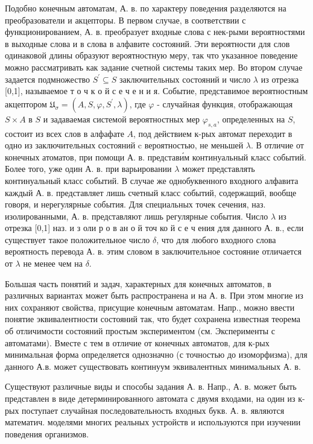 \documentclass[10pt]{article}
\begin{document}
Подобно конечным автоматам, А. в. по характеру поведения разделяются на преобразователи и акцепторы. В первом случае, в соответствии с функционированием, А. в. преобразует входные слова с нек-рыми вероятностями в выходные слова и в слова в алфавите состояний. Эти вероятности для слов одинаковой длины образуют вероятностную меру, так что указанное поведение можно рассматривать как задание счетной системы таких мер. Во втором случае задается подмножество $S^{\prime} \subseteq S$ заключительных состояний и число $\lambda$ из отрезка [0,1], называемое т о ч к о й с е ч е н и я. Событие, представимое вероятностным акцептором $\mathfrak{U}_{\sigma}=\left(A, S, \varphi, S^{\prime}, \lambda\right)$, где $\varphi$ - случайная функция, отображающая $S \times A$ в $S$ и задаваемая системой вероятностных мер $\varphi_{s, a}$, определенных на $S$, состоит из всех слов в алфафате $A$, под действием к-рых автомат переходит в одно из заключительных состояний $\mathrm{c}$ вероятностью, не меньшей $\lambda$. В отличие от конечных атоматов, при помощи А. в. представи́м континуальный класс событий. Более того, уже один А. в. при варьировании $\lambda$ может представлять континуальный класс событий. В случае же однобуквенного входного алфавита каждый А. в. представляет лишь счетный класс событий, содержащий, вообще говоря, и нерегулярные события. Для специальных точек сечения, наз. изолированными, А. в. представляют лишь регулярные события. Число $\lambda$ из отрезка [0,1] наз. и з оли р о в ан о й точ ко й с е ч ения для данного А. в., если существует такое положительное число $\delta$, что для любого входного слова вероятность перевода А. в. этим словом в заключительное состояние отличается от $\lambda$ не менее чем на $\delta$.



Большая часть понятий и задач, характерных для конечных автоматов, в различных вариантах может быть распространена и на А. в. При этом многие из них сохраняют свойства, присущие конечным автоматам. Напр., можно ввести понятие эквивалентности состояний так, что будет сохранена известная теорема об отличимости состояний простым экспериментом (см. Эксперименты с автоматами). Вместе с тем в отличие от конечных автоматов, для к-рых минимальная форма определяется однозначно (с точностью до изоморфизма), для данного А.в. может существовать континуум эквивалентных минимальных А. в.



Существуют различные виды и способы задания А. в. Напр., А. в. может быть представлен в виде детерминированного автомата с двумя входами, на один из к-рых поступает случайная последовательность входных букв. А. в. являются математич. моделями многих реальных устройств и используются при изучении поведения организмов.
\end{document}
